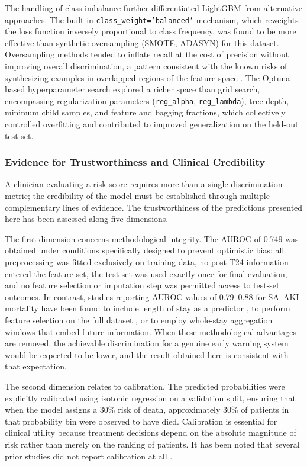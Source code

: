 The handling of class imbalance further differentiated LightGBM from alternative approaches. The built-in \texttt{class\_weight='balanced'} mechanism, which reweights the loss function inversely proportional to class frequency, was found to be more effective than synthetic oversampling (SMOTE, ADASYN) for this dataset. Oversampling methods tended to inflate recall at the cost of precision without improving overall discrimination, a pattern consistent with the known risks of synthesizing examples in overlapped regions of the feature space \citep{Blagus_2013,Saez_2015}. The Optuna-based hyperparameter search explored a richer space than grid search, encompassing regularization parameters (\texttt{reg\_alpha}, \texttt{reg\_lambda}), tree depth, minimum child samples, and feature and bagging fractions, which collectively controlled overfitting and contributed to improved generalization on the held-out test set.

\subsubsection{Evidence for Trustworthiness and Clinical Credibility}
A clinician evaluating a risk score requires more than a single discrimination metric; the credibility of the model must be established through multiple complementary lines of evidence. The trustworthiness of the predictions presented here has been assessed along five dimensions.

The first dimension concerns methodological integrity. The AUROC of 0.749 was obtained under conditions specifically designed to prevent optimistic bias: all preprocessing was fitted exclusively on training data, no post-T24 information entered the feature set, the test set was used exactly once for final evaluation, and no feature selection or imputation step was permitted access to test-set outcomes. In contrast, studies reporting AUROC values of 0.79--0.88 for SA--AKI mortality have been found to include length of stay as a predictor \citep{Chen_2025}, to perform feature selection on the full dataset \citep{Li_2023_SciRep}, or to employ whole-stay aggregation windows that embed future information. When these methodological advantages are removed, the achievable discrimination for a genuine early warning system would be expected to be lower, and the result obtained here is consistent with that expectation.

The second dimension relates to calibration. The predicted probabilities were explicitly calibrated using isotonic regression on a validation split, ensuring that when the model assigns a 30\% risk of death, approximately 30\% of patients in that probability bin were observed to have died. Calibration is essential for clinical utility because treatment decisions depend on the absolute magnitude of risk rather than merely on the ranking of patients. It has been noted that several prior studies did not report calibration at all \citep{Chen_2025,Li_2023_SciRep}.

